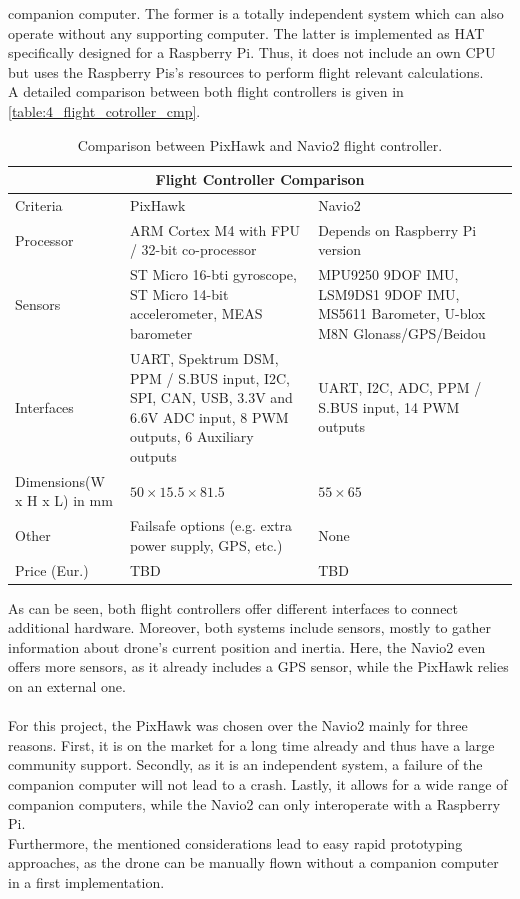 companion computer.
The former is a totally independent system which can also operate without any 
supporting computer.
The latter is implemented as \ac{HAT} specifically designed for a Raspberry 
Pi.
Thus, it does not include an own \ac{CPU} but uses the Raspberry Pis's 
resources to perform flight relevant calculations.\\
A detailed comparison between both flight controllers is given in 
\autoref{table:4_flight_cotroller_cmp}.
\begin{table}[h!]
    \centering
    \begin{tabular}[c]{|p{4cm}||p{4cm}|p{4cm}|}
    \hline
    \multicolumn{3}{|c|}{Flight Controller Comparison}\\
    \hline
    Criteria & PixHawk & Navio2\\
    \hline
    \hline
    Processor & ARM Cortex M4 with FPU / 32-bit co-processor & Depends on Raspberry
    Pi version\\
    \hline
    Sensors & ST Micro 16-bti gyroscope, ST Micro 14-bit accelerometer, MEAS
    barometer & MPU9250 9DOF IMU, LSM9DS1 9DOF IMU, MS5611 Barometer, U-blox M8N 
    Glonass/\acs{GPS}/Beidou\\
    \hline
    Interfaces & UART, Spektrum DSM, PPM / S.BUS input, I2C, SPI, CAN, USB, 3.3V 
    and 6.6V ADC input, 8 \acs{PWM} outputs, 6 Auxiliary outputs & UART, I2C, ADC, PPM / 
    S.BUS input, 14 \acs{PWM} outputs\\
    \hline
    Dimensions\newline(W x H x L) in mm & $50 \times 15.5 \times 81.5$ & $55 \times 65$\\ 
    \hline
    Other & Failsafe options (e.g. extra power supply, \acs{GPS}, etc.) & None\\
    \hline
    Price (Eur.) & TBD & TBD\\
    \hline
    \end{tabular}
    \caption[Flight controller comparison]{Comparison between PixHawk and 
    Navio2 flight controller.}
    \label{table:4_flight_cotroller_cmp}
\end{table}

\noindent As can be seen, both flight controllers offer different interfaces 
to connect additional hardware.
Moreover, both systems include sensors, mostly to gather information about 
drone's current position and inertia.
Here, the Navio2 even offers more sensors, as it already includes a \ac{GPS} 
sensor, while the PixHawk relies on an external one.\\\\
\noindent For this project, the PixHawk was chosen over the Navio2 mainly for 
three reasons.
First, it is on the market for a long time already and thus have a large 
community support.
Secondly, as it is an independent system, a failure of the companion computer 
will not lead to a crash.
Lastly, it allows for a wide range of companion computers, while the Navio2 
can only interoperate with a Raspberry Pi.\\
Furthermore, the mentioned considerations lead to easy rapid prototyping 
approaches, as the drone can be manually flown without a companion computer in
a first implementation.

